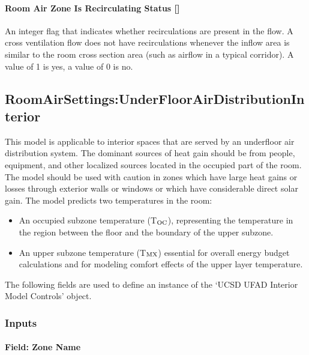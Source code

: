 \paragraph{Room Air Zone Is Recirculating Status {[]}}\label{room-air-zone-is-recirculating-status}

An integer flag that indicates whether recirculations are present in the flow. A cross ventilation flow does not have recirculations whenever the inflow area is similar to the room cross section area (such as airflow in a typical corridor). A value of 1 is yes, a value of 0 is no.

\subsection{RoomAirSettings:UnderFloorAirDistributionInterior}\label{roomairsettingsunderfloorairdistributioninterior}

This model is applicable to interior spaces that are served by an underfloor air distribution system. The dominant sources of heat gain should be from people, equipment, and other localized sources located in the occupied part of the room. The model should be used with caution in zones which have large heat gains or losses through exterior walls or windows or which have considerable direct solar gain. The model predicts two temperatures in the room:

\begin{itemize}
\item
  An occupied subzone temperature (T\(_{\rm{OC}}\)), representing the temperature in the region between the floor and the boundary of the upper subzone.
\item
  An upper subzone temperature (T\(_{\rm{MX}}\)) essential for overall energy budget calculations and for modeling comfort effects of the upper layer temperature.
\end{itemize}

The following fields are used to define an instance of the `UCSD UFAD Interior Model Controls' object.

\subsubsection{Inputs}\label{inputs-2016-06-17-0938}

\paragraph{Field: Zone Name}\label{field-zone-name-6-003}


